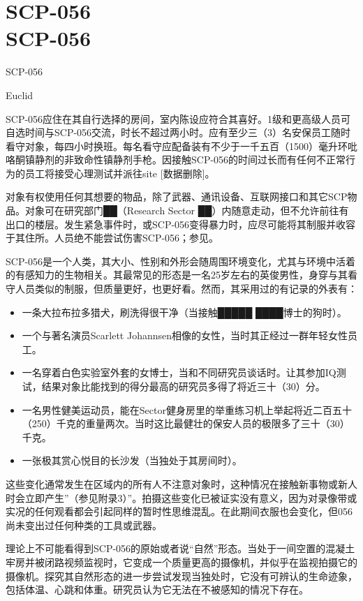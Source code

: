 \chapter[SCP-056]{
    SCP-056 \\
    SCP-056
}

\label{chap:SCP-056}

SCP-056

Euclid

SCP-056应住在其自行选择的房间，室内陈设应符合其喜好。1级和更高级人员可自选时间与SCP-056交流，时长不超过两小时。应有至少三（3）名安保员工随时看守对象，每四小时换班。每名看守应配备装有不少于一千五百（1500）毫升环吡咯酮镇静剂的非致命性镇静剂手枪。因接触SCP-056的时间过长而有任何不正常行为的员工将接受心理测试并派往site {[}数据删除]。

对象有权使用任何其想要的物品，除了武器、通讯设备、互联网接口和其它SCP物品。对象可在研究部门██（Research Sector ██）内随意走动，但不允许前往有出口的楼层。发生紧急事件时，或SCP-056变得暴力时，应尽可能将其制服并收容于其住所。人员绝不能尝试伤害SCP-056；参见。

SCP-056是一个人类，其大小、性别和外形会随周围环境变化，尤其与环境中活着的有感知力的生物相关。其最常见的形态是一名25岁左右的英俊男性，身穿与其看守人员类似的制服，但质量更好，也更好看。然而，其采用过的有记录的外表有：

\begin{itemize}
\item 一条大拉布拉多猎犬，刷洗得很干净（当接触█████ ████博士的狗时）。
\item 一个与著名演员Scarlett Johannsen相像的女性，当时其正经过一群年轻女性员工。
\item 一名穿着白色实验室外套的女博士，当和不同研究员谈话时。让其参加IQ测试，结果对象比能找到的得分最高的研究员多得了将近三十（30）分。
\item 一名男性健美运动员，能在Sector健身房里的举重练习机上举起将近二百五十（250）千克的重量两次。当时这比最健壮的保安人员的极限多了三十（30）千克。
\item 一张极其赏心悦目的长沙发（当独处于其房间时）。
\end{itemize}

这些变化通常发生在区域内的所有人不注意对象时，这种情况在接触新事物或新人时会立即产生''（参见附录3）''。拍摄这些变化已被证实没有意义，因为对录像带或实况的任何观看都会引起同样的暂时性思维混乱。在此期间衣服也会变化，但056尚未变出过任何种类的工具或武器。

理论上不可能看得到SCP-056的原始或者说“自然”形态。当处于一间空置的混凝土牢房并被闭路视频监视时，它变成一个质量更高的摄像机，并似乎在监视拍摄它的摄像机。探究其自然形态的进一步尝试发现当独处时，它没有可辨认的生命迹象，包括体温、心跳和体重。研究员认为它无法在不被感知的情况下存在。

